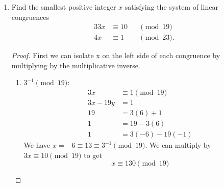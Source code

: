 \documentclass[11pt]{article}
\theoremstyle{definition}
\begin{document}
\begin{enumerate}
    \item Find the smallest positive integer $x$ satisfying the system of linear congruences
        \begin{alignat*}{3}
            3x &\equiv 10 &&\pmod{19} \\
            4x &\equiv 1 &&\pmod{23}.
        \end{alignat*}
    \begin{proof}
        First we can isolate x on the left side of each congruence by multiplying by the multiplicative inverse.
        \begin{enumerate}
            \item $3^{-1}\pmod{19}$:
            \begin{align*}
                3x &\equiv 1\pmod{19} \\
                3x-19y &= 1 \\
                19 &= 3(6)+1 \\
                1 &= 19-3(6) \\
                1 &= 3(-6) - 19(-1)
            \end{align*}
            We have $x=-6\equiv 13\equiv 3^{-1}\pmod{19}$. We can multiply by $3x\equiv 10\pmod{19}$ to get 
            \[ x\equiv 130\pmod{19} \]


\end{enumerate}
\end{proof}
\end{enumerate}
\end{document}
